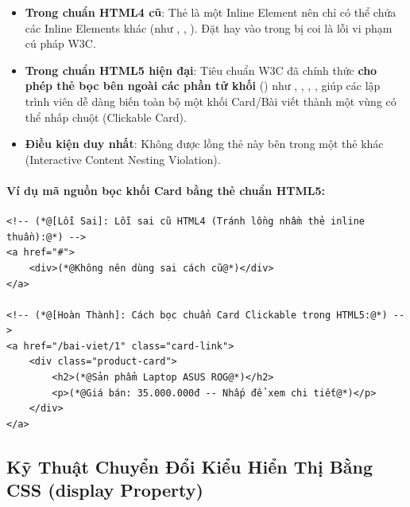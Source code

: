 \begin{noteBox}
\begin{itemize}[leftmargin=1.5em, itemsep=3pt, parsep=0pt]
    \item \textbf{Trong chuẩn HTML4 cũ}: Thẻ  là một Inline Element nên chỉ có thể chứa các Inline Elements khác (như , , ). Đặt  hay  vào trong  bị coi là lỗi vi phạm cú pháp W3C.
    \item \textbf{Trong chuẩn HTML5 hiện đại}: Tiêu chuẩn W3C đã chính thức \textbf{cho phép thẻ  bọc bên ngoài các phần tử khối} () như , , , , giúp các lập trình viên dễ dàng biến toàn bộ một khối Card/Bài viết thành một vùng có thể nhấp chuột (Clickable Card).
    \item \textbf{Điều kiện duy nhất}: Không được lồng thẻ  này bên trong một thẻ  khác (Interactive Content Nesting Violation).
\end{itemize}
\end{noteBox}

\paragraph{Ví dụ mã nguồn bọc khối Card bằng thẻ  chuẩn HTML5:}
\begin{codeWindow}
\begin{lstlisting}[language=HTML5]
<!-- (*@[Lỗi Sai]: Lỗi sai cũ HTML4 (Tránh lồng nhầm thẻ inline thuần):@*) -->
<a href="#">
    <div>(*@Không nên dùng sai cách cũ@*)</div>
</a>

<!-- (*@[Hoàn Thành]: Cách bọc chuẩn Card Clickable trong HTML5:@*) -->
<a href="/bai-viet/1" class="card-link">
    <div class="product-card">
        <h2>(*@Sản phẩm Laptop ASUS ROG@*)</h2>
        <p>(*@Giá bán: 35.000.000đ -- Nhấp để xem chi tiết@*)</p>
    </div>
</a>
\end{lstlisting}
\end{codeWindow}

\subsection{Kỹ Thuật Chuyển Đổi Kiểu Hiển Thị Bằng CSS (display Property)}

